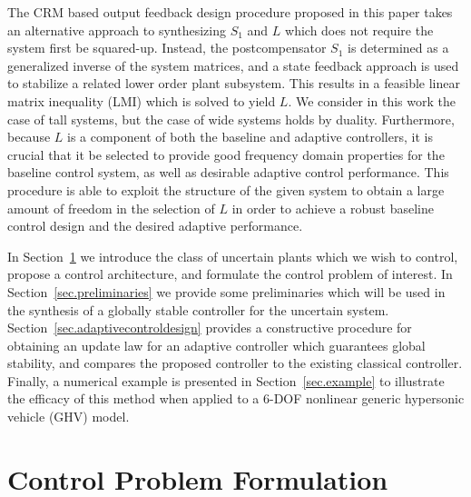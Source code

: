 \documentclass[]{../sty/aiaa-tc}
\begin{document}
  The CRM based output feedback design procedure proposed in this paper takes an alternative approach to synthesizing $S_{1}$ and $L$ which does not require the system first be squared-up.
  Instead, the postcompensator $S_{1}$ is determined as a generalized inverse of the system matrices, and a state feedback approach is used to stabilize a related lower order plant subsystem.
  This results in a feasible linear matrix inequality (LMI) which is solved to yield $L$.
  We consider in this work the case of tall systems, but the case of wide systems holds by duality.
  Furthermore, because $L$ is a component of both the baseline and adaptive controllers, it is crucial that it be selected to provide good frequency domain properties for the baseline control system, as well as desirable adaptive control performance.
  This procedure is able to exploit the structure of the given system to obtain a large amount of freedom in the selection of $L$ in order to achieve a robust baseline control design and the desired adaptive performance.

  In Section~\ref{sec.controlproblem} we introduce the class of uncertain plants which we wish to control, propose a control architecture, and formulate the control problem of interest.
  In Section~\ref{sec.preliminaries} we provide some preliminaries which will be used in the synthesis of a globally stable controller for the uncertain system.
  Section~\ref{sec.adaptivecontroldesign} provides a constructive procedure for obtaining an update law for an adaptive controller which guarantees global stability, and compares the proposed controller to the existing classical controller.
  Finally, a numerical example is presented in Section~\ref{sec.example} to illustrate the efficacy of this method when applied to a 6-DOF nonlinear generic hypersonic vehicle (GHV) model\cite{wiese.adaptive.2013,rollins.nonlinear.2013}.

  \section{Control Problem Formulation}\label{sec.controlproblem}
\end{document}
